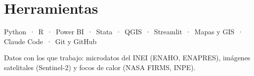 \documentclass[10.5pt]{article}
\begin{document}
\section{Herramientas}
Python \,·\, R \,·\, Power BI \,·\, Stata \,·\, QGIS \,·\, Streamlit \,·\, Mapas y GIS \,·\, Claude Code \,·\, Git y GitHub

\vspace{4pt}
{\color{suave}Datos con los que trabajo: microdatos del INEI (ENAHO, ENAPRES), imágenes satelitales (Sentinel-2) y focos de calor (NASA FIRMS, INPE).}
\end{document}
